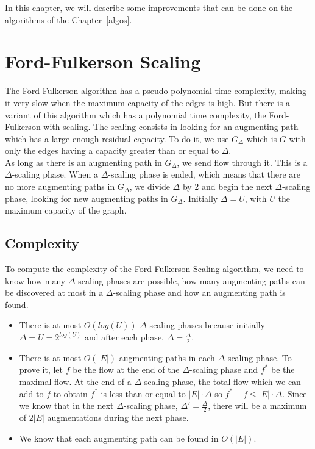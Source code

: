
In this chapter, we will describe some improvements that can be done on the algorithms of the Chapter~\ref{algos}.

\section{Ford-Fulkerson Scaling}
The Ford-Fulkerson algorithm has a pseudo-polynomial time complexity, making it very slow when the maximum capacity of the edges is high. But there is a variant of this algorithm which has a polynomial time complexity, the Ford-Fulkerson with scaling. The scaling consists in looking for an augmenting path which has a large enough residual capacity. To do it, we use $G_\Delta$ which is $G$ with only the edges having a capacity greater than or equal to $\Delta$. \\

As long as there is an augmenting path in $G_\Delta$, we send flow through it. This is a $\Delta$-scaling phase. When a $\Delta$-scaling phase is ended, which means that there are no more augmenting paths in $G_\Delta$, we divide $\Delta$ by 2 and begin the next $\Delta$-scaling phase, looking for new augmenting paths in $G_\Delta$. Initially $\Delta = U$, with $U$ the maximum capacity of the graph.

\subsection{Complexity}
To compute the complexity of the Ford-Fulkerson Scaling algorithm, we need to know how many $\Delta$-scaling phases are possible, how many augmenting paths can be discovered at most in a $\Delta$-scaling phase and how an augmenting path is found.

\begin{itemize}
\item There is at most $O(log(U))$ $\Delta$-scaling phases because initially $\Delta = U = 2^{log(U)}$ and after each phase, $\Delta=\frac{\Delta}{2}$.
\item There is at most $O(|E|)$ augmenting paths in each $\Delta$-scaling phase. To prove it, let $f$ be the flow at the end of the $\Delta$-scaling phase and $f^*$ be the maximal flow. At the end of a $\Delta$-scaling phase, the total flow which we can add to $f$ to obtain $f^*$ is less than or equal to $|E| \cdot \Delta$ so $f^*-f \leq |E| \cdot \Delta$. Since we know that in the next $\Delta$-scaling phase, $\Delta'=\frac{\Delta}{2}$, there will be a maximum of $2|E|$ augmentations during the next phase.
\item We know that each augmenting path can be found in $O(|E|)$.
\end{itemize}

